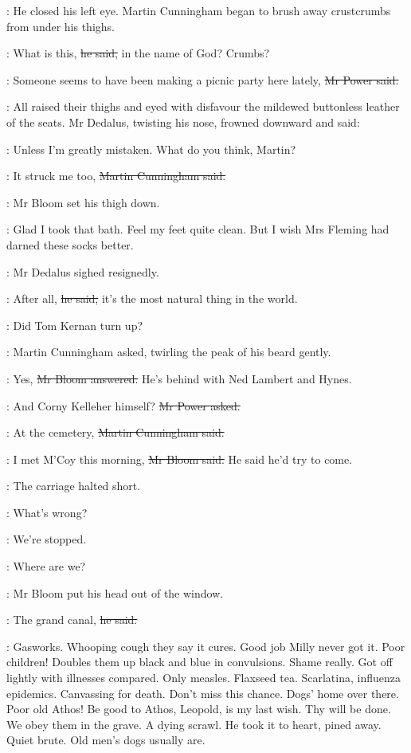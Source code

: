 :
He closed his left eye.
Martin Cunningham began to brush away crustcrumbs from under his thighs.

\cunningham:
What is this,
\sout{he said,}
in the name of God?
Crumbs?

\power:
Someone seems to have been making a picnic party here lately,
\sout{Mr Power said.}

:
All raised their thighs and eyed with disfavour
the mildewed buttonless leather of the seats.
Mr Dedalus, twisting his nose, frowned downward and said:

\simon:
Unless I'm greatly mistaken.
What do you think, Martin?

\cunningham:
It struck me too,
\sout{Martin Cunningham said.}

:
Mr Bloom set his thigh down.

\BloomInt:
Glad I took that bath.
Feel my feet quite clean.
But I wish Mrs Fleming had darned these socks better.

:
Mr Dedalus sighed resignedly.

\simon:
After all,
\sout{he said,}
it's the most natural thing in the world.

\cunningham:
Did Tom Kernan turn up?

:
Martin Cunningham asked,
twirling the peak of his beard
gently.

\Bloom:
Yes,
\sout{Mr Bloom answered.}
He's behind with Ned Lambert and Hynes.

\power:
And Corny Kelleher himself?
\sout{Mr Power asked.}

\cunningham:
At the cemetery,
\sout{Martin Cunningham said.}

\Bloom:
I met M'Coy this morning,
\sout{Mr Bloom said.}
He said he'd try to come.

:
The carriage halted short.

\simon:
What's wrong?

\power:
We're stopped.

\cunningham:
Where are we?

:
Mr Bloom put his head out of the window.

\Bloom:
The grand canal,
\sout{he said.}

\BloomInt:
Gasworks.
Whooping cough they say it cures.
Good job Milly never got it.
Poor children!
Doubles them up black and blue in convulsions.
Shame really.
Got off lightly with illnesses compared.
Only measles.
Flaxseed tea.
Scarlatina, influenza epidemics.
Canvassing for death.
Don't miss this chance.
Dogs' home over there.
Poor old Athos!
Be good to Athos, Leopold, is my last wish.
Thy will be done.
We obey them in the grave.
A dying scrawl.
He took it to heart, pined away.
Quiet brute.
Old men's dogs usually are.

